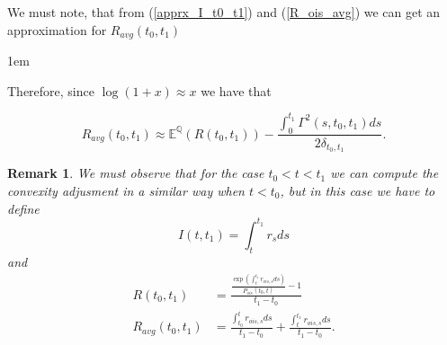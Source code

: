 \documentclass[a4paper,10pt]{article}
\newtheorem{remark}[theorem]{Remark}
\newcommand{\1}{\mathbf{1}}
\begin{document}
We must note, that from (\ref{apprx_I_t0_t1}) and (\ref{R_ois_avg}) we can get an approximation for $R_{avg}(t_0,t_1)$

\hspace{2cm}
\fboxsep1em

Therefore, since $\log(1+x)\approx x$ we have that

\begin{equation*}
R_{avg}(t_0,t_1) \approx  \mathbb{E}^{\mathbb{Q}}\left(R(t_0,t_1)\right) - \frac{\int_{0}^{t_1}\Gamma^{2}(s,t_0,t_1) ds}{2\delta_{t_0,t_1}}.
\end{equation*}


\begin{remark}
We must observe that for the case $t_0 < t < t_1$ we can compute the convexity adjusment in a similar way when $t < t_0$, but in this case we have to define
\begin{equation*}
I(t,t_1)=\int_{t}^{t_1} r_s ds
\end{equation*}
and 
\begin{align*}
R(t_0,t_1) &= \frac{\frac{\exp(\int_{t}^{t_1} r_{ois,s} ds )}{P_{ois}(t_0,t)} - 1}{t_1 - t_0} \\
R_{avg}(t_0,t_1) &= \frac{\int_{t_0}^{t} r_{ois,s} ds}{t_1-t_0} +  \frac{\int_{t}^{t_1} r_{ois,s} ds}{t_1-t_0}.   
\end{align*}
\end{remark}
\end{document}
